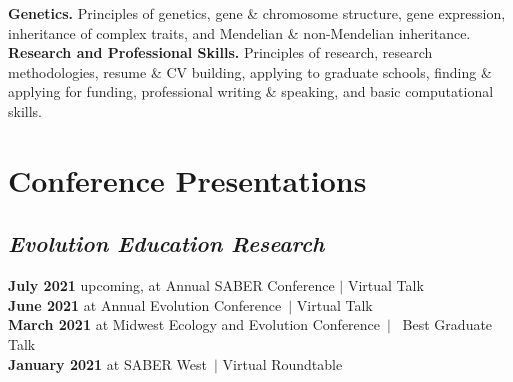 \documentclass[]{article}
\begin{document}
\textbf{Genetics.} Principles of genetics, gene \& chromosome structure, gene expression, inheritance of complex traits, and Mendelian \& non-Mendelian inheritance.\\

\textbf{Research and Professional Skills.} Principles of research, research methodologies, resume \& CV building, applying to graduate schools, finding \& applying for funding, professional writing \& speaking, and basic computational skills.

\vspace{5mm}

\section{\fontsize{16}{48}\selectfont Conference Presentations}
\vspace{-5mm}

\subsection{\fontsize{12}{36}\selectfont \textit{Evolution Education Research}}

\textbf{July 2021} upcoming, at Annual SABER Conference $\vert$ Virtual Talk \hspace{0.3mm} \href{https://ledelaney.org/talks/2021saber}{\faImages} \href{https://github.com/ledelaney/07-21-SABER}{\faGithub}\\
\textbf{June 2021} at Annual Evolution Conference\ $\vert$ Virtual Talk \hspace{0.3mm} \href{https://uofi.box.com/v/2021evolution}{\faVideo} \href{https://ledelaney.org/talks/2021evolution}{\faImages} \href{https://github.com/ledelaney/06-21-Evolution}{\faGithub}\\
\textbf{March 2021} at Midwest Ecology and Evolution Conference\ $\vert$ \faAward\ Best Graduate Talk\ \hspace{0.1mm} \href{https://uofi.box.com/v/2021meec-talk}{\faVideo} \href{https://ledelaney.org/talks/2021meec/}{\faImages} \href{https://github.com/ledelaney/03-21-MEEC}{\faGithub}\\
\textbf{January 2021} at SABER West\ $\vert$ Virtual Roundtable \hspace{0.4mm} \href{https://ledelaney.org/talks/2021saberw/}{\faImages} \href{https://github.com/ledelaney/01-21-SABERwest}{\faGithub}

\vspace{-5mm}
\end{document}
